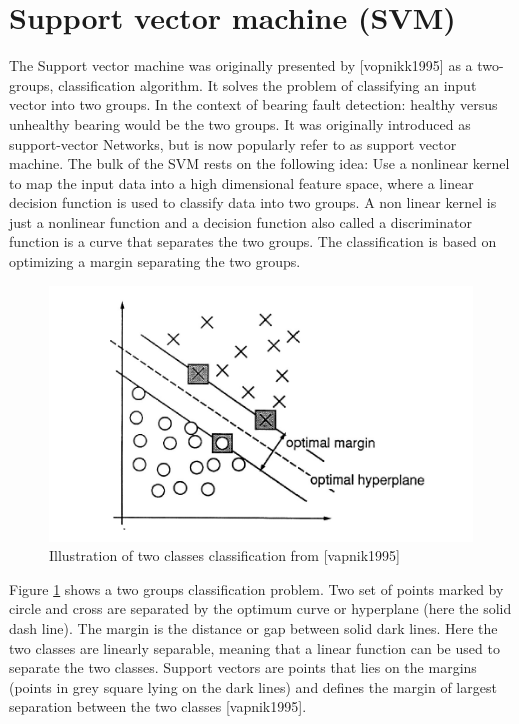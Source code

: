 \documentclass[../Main/thesis.tex]{subfiles}
\begin{document}
\section{Support vector machine (SVM)}
\label{sec:svm}
The Support vector machine was originally presented by [vopnikk1995] as a two-groups, classification algorithm. It solves the problem of classifying an input vector into two groups. In the context of bearing fault detection: healthy versus unhealthy bearing would be the two groups. It was originally introduced as support-vector Networks, but is now popularly refer to as support vector machine. The bulk of the SVM rests on the following idea: Use a nonlinear kernel to map the input data into a high dimensional feature space, where a linear decision function is used to classify data into two groups.
\justify
A non linear kernel is just a nonlinear function and a decision function also called a discriminator function is a curve that separates the two groups. The classification is based on optimizing a margin separating the two groups. 
\begin{figure}[H] %
   \centering
   \includegraphics[width=5in]{../fig/svm2d.png} 
   \caption{Illustration of two classes classification from [vapnik1995]}
   \label{fig:svm2d}
\end{figure}
\justify
Figure \ref{fig:svm2d} shows a two groups classification problem. Two set of points marked by circle and cross are separated by the optimum curve or hyperplane (here the solid dash line). The margin is the distance or gap between solid dark lines. Here the two classes are linearly separable, meaning that a linear function can be used to separate the two classes. Support vectors are points that lies on the margins (points in grey square lying on the dark lines) and defines the margin of largest separation between the two classes [vapnik1995].
\end{document}
